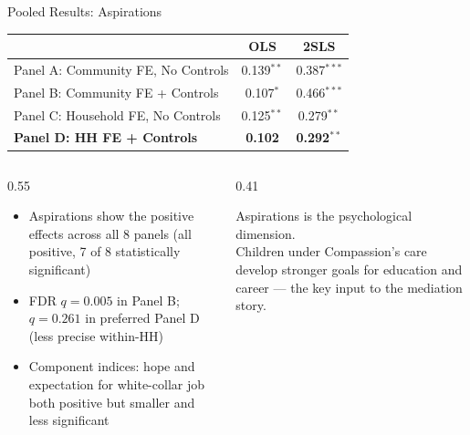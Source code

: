\documentclass[aspectratio=169, 10pt]{beamer}
\begin{document}
\begin{frame}{Pooled Results: Aspirations}
  \begin{center}
  \small
  \begin{tabular}{lcc}
    \toprule
    & \textbf{OLS} & \textbf{2SLS} \\
    \midrule
    Panel A: Community FE, No Controls     & 0.139$^{**}$ & 0.387$^{***}$ \\
    Panel B: Community FE + Controls       & 0.107$^{*}$  & 0.466$^{***}$ \\
    Panel C: Household FE, No Controls    & 0.125$^{**}$ & 0.279$^{**}$  \\
    \textbf{Panel D: HH FE + Controls}    & \textbf{0.102} & \textbf{0.292}$^{**}$ \\
    \bottomrule
  \end{tabular}
  \end{center}
  \vspace{0.4em}
  \begin{columns}
    \begin{column}{0.55\textwidth}
      \begin{itemize}
        \item Aspirations show the  positive effects across all 8 panels (all positive, 7 of 8 statistically significant)
        \item FDR $q = 0.005$ in Panel B; $q = 0.261$ in preferred Panel D (less precise within-HH)
        \item Component indices: hope and expectation for white-collar job both positive but smaller and less significant
      \end{itemize}
    \end{column}
    \begin{column}{0.41\textwidth}
      \begin{keybox}
        Aspirations is the  psychological dimension.\\[0.4em]
        Children under Compassion's care develop stronger goals for education and career --- the key input to the mediation story.
      \end{keybox}
    \end{column}
  \end{columns}
\end{frame}
\end{document}
